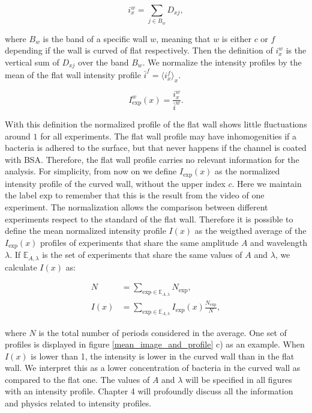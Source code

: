 \begin{equation}
	i_x^w = \sum_{j \in B_w} D_{xj},
\end{equation}

where $B_w$ is the band of a specific wall $w$, meaning that $w$ is either $c$ or $f$ depending if the wall is curved of flat respectively. Then the definition of $i_x^w$ is the vertical sum of $D_{xj}$ over the band $B_w$. We normalize the intensity profiles by the mean of the flat wall intensity profile $\bar{i}^f = \langle  i_x^f\rangle_x $. 

\begin{equation}  \label{eq:Intensity profile on experiment}
	I_{\text{exp}}^w(x) = \frac{i_x^w}{\bar{i}^w}.
\end{equation}

With this definition the normalized profile of the flat wall shows little fluctuations around $1$ for all experiments. The flat wall profile may have inhomogenities if a bacteria is adhered to the surface, but that never happens if the channel is coated with BSA. Therefore, the flat wall profile carries no relevant information for the analysis. For simplicity, from now on we define $I_{\text{exp}}(x)$ as the normalized intensity profile of the curved wall, without the upper index $c$. Here we maintain the label $\text{exp}$ to remember that this is the result from the video of one experiment. The normalization allows the comparison between different experiments respect to the standard of the flat wall. Therefore it is possible to define the mean normalized intensity profile $I(x)$ as the weigthed average of the $I_{\text{exp}}(x)$ profiles of experiments that share the same amplitude $A$ and wavelength $\lambda$. If $\mathbb{E}_{A,\lambda}$ is the set of experiments that share the same values of $A$ and $\lambda$, we calculate $I(x)$ as:
 
 \begin{align}
    N &= \sum_{\text{exp} \in \mathbb{E}_{A,\lambda}} N_{\text{exp}},     \\
    I(x) &= \sum_{\text{exp} \in \mathbb{E}_{A,\lambda}} I_{\text{exp}}(x) \frac{N_{\text{exp}}}{N},
    \label{eq:Intensity profile}
 \end{align}
 
where $N$ is the total number of periods considered in the average. One set of profiles is displayed in figure \ref{mean_image_and_profile} c) as an example. When $I(x)$ is lower than 1, the intensity is lower in the curved wall than in the flat wall. We interpret this as a lower concentration of bacteria in the curved wall as compared to the flat one. The values of $A$ and $\lambda$ will be specified in all figures with an intensity profile. Chapter 4 will profoundly discuss all the information and physics related to intensity profiles.


